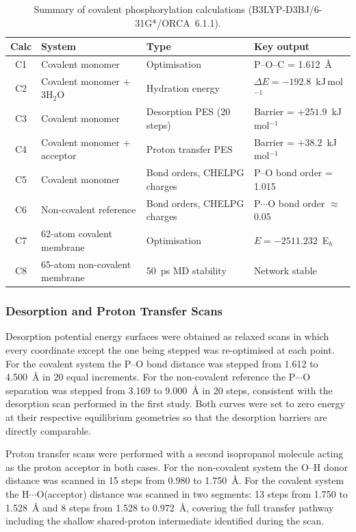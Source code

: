 \documentclass[12pt,a4paper]{report}
\begin{document}
\begin{table}[h!]
\centering
\caption{Summary of covalent phosphorylation calculations 
(B3LYP-D3BJ/6-31G*/ORCA~6.1.1).}
\label{tab:covalent-calcs}
\begin{tabular}{c l l l}
\toprule
Calc & System & Type & Key output \\
\midrule
C1 & Covalent monomer & Optimisation & 
P--O--C = 1.612~\AA{} \\
C2 & Covalent monomer + 3H\(_2\)O & Hydration energy & 
$\Delta E = -192.8$~kJ\,mol\(^{-1}\) \\
C3 & Covalent monomer & Desorption PES (20 steps) & 
Barrier = $+251.9$~kJ\,mol\(^{-1}\) \\
C4 & Covalent monomer + acceptor & Proton transfer PES & 
Barrier = $+38.2$~kJ\,mol\(^{-1}\) \\
C5 & Covalent monomer & Bond orders, CHELPG charges & 
P--O bond order = 1.015 \\
C6 & Non-covalent reference & Bond orders, CHELPG charges & 
P$\cdots$O bond order $\approx$ 0.05 \\
C7 & 62-atom covalent membrane & Optimisation & 
$E = -2511.232$~E\(_h\) \\
C8 & 65-atom non-covalent membrane & 50~ps MD stability & 
Network stable \\
\bottomrule
\end{tabular}
\end{table}

\subsubsection{Desorption and Proton Transfer Scans}

Desorption potential energy surfaces were obtained as 
relaxed scans in which every coordinate except the one 
being stepped was re-optimised at each point. For the 
covalent system the P--O bond distance was stepped from 
1.612 to 4.500~\AA{} in 20 equal increments. For the 
non-covalent reference the P$\cdots$O separation was 
stepped from 3.169 to 9.000~\AA{} in 20 steps, consistent 
with the desorption scan performed in the first study. 
Both curves were set to zero energy at their respective 
equilibrium geometries so that the desorption barriers 
are directly comparable.

Proton transfer scans were performed with a second 
isopropanol molecule acting as the proton acceptor in 
both cases. For the non-covalent system the O--H donor 
distance was scanned in 15 steps from 0.980 to 1.750~\AA{}. 
For the covalent system the H$\cdots$O(acceptor) distance 
was scanned in two segments: 13 steps from 1.750 to 
1.528~\AA{} and 8 steps from 1.528 to 0.972~\AA{}, covering 
the full transfer pathway including the shallow 
shared-proton intermediate identified during the scan.
\end{document}
